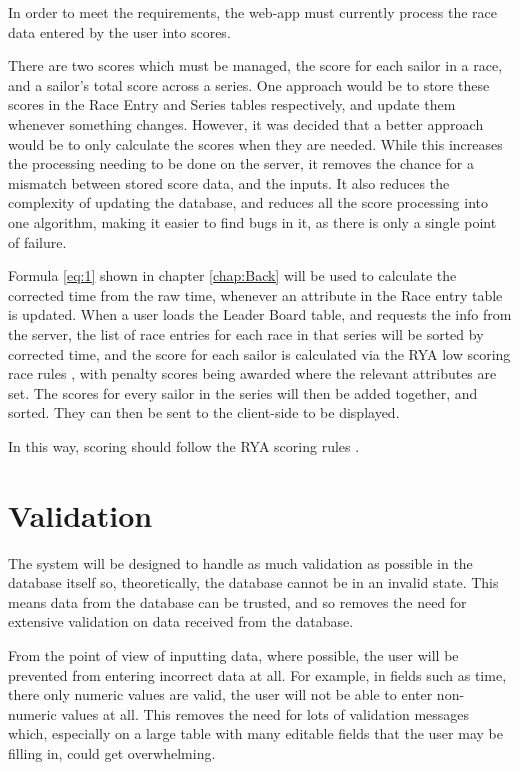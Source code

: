 \documentclass{l4proj}
\begin{document}
In order to meet the requirements, the web-app must currently process the race data entered by the user into scores.

There are two scores which must be managed, the score for each sailor in a race, and a sailor's total score across a series. One approach would be to store these scores in the Race Entry and Series tables respectively, and update them whenever something changes. However, it was decided that a better approach would be to only calculate the scores when they are needed. While this increases the processing needing to be done on the server, it removes the chance for a mismatch between stored score data, and the inputs. It also reduces the complexity of updating the database, and reduces all the score processing into one algorithm, making it easier to find bugs in it, as there is only a single point of failure.

Formula \ref{eq:1} shown in chapter \ref{chap:Back} will be used to calculate the corrected time from the raw time, whenever an attribute in the Race entry table is updated. When a user loads the Leader Board table, and requests the info from the server, the list of race entries for each race in that series will be sorted by corrected time, and the score for each sailor is calculated via the RYA low scoring race rules \citep{RYAscore}, with penalty scores being awarded where the relevant attributes are set. The scores for every sailor in the series will then be added together, and sorted. They can then be sent to the client-side to be displayed.

In this way, scoring should follow the RYA scoring rules \citep{RYAscore}.

\section{Validation}

The system will be designed to handle as much validation as possible in the database itself so, theoretically, the database cannot be in an invalid state. This means data from the database can be trusted, and so removes the need for extensive validation on data received from the database.

From the point of view of inputting data, where possible, the user will be prevented from entering incorrect data at all. For example, in fields such as time, there only numeric values are valid, the user will not be able to enter non-numeric values at all. This removes the need for lots of validation messages which, especially on a large table with many editable fields that the user may be filling in, could get overwhelming.
\end{document}
